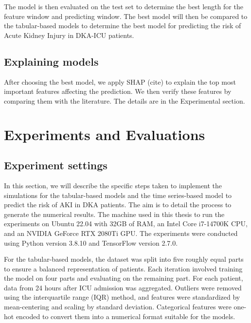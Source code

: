 \documentclass[sn-mathphys-num]{sn-jnl}%
\theoremstyle{thmstyleone}%
\theoremstyle{thmstyletwo}%
\theoremstyle{thmstylethree}%
\begin{document}
The model is then evaluated on the test set to determine the best length for the feature window and predicting window.
The best model will then be compared to the tabular-based models to determine the best model for predicting the risk of Acute Kidney Injury in DKA-ICU patients.



\subsection{Explaining models}

After choosing the best model, we apply SHAP (cite) to explain the top most important features affecting the prediction. We then verify these features by comparing them with the literature. The details are in the Experimental section.

\section{Experiments and Evaluations}
\label{sec:evaluation}


\subsection{Experiment settings}
\label{experiments_settings}
In this section, we will describe the specific steps taken to implement the simulations for the tabular-based models and the time series-based model to predict the risk of AKI in DKA patients.
The aim is to detail the process to generate the numerical results.
The machine used in this thesis to run the experiments on Ubuntu 22.04 with 32GB of RAM, an Intel Core i7-14700K CPU, and an NVIDIA GeForce RTX 2080Ti GPU. 
The experiments were conducted using Python version 3.8.10 and TensorFlow version 2.7.0. 

For the tabular-based models, the dataset was split into five roughly equal parts to ensure a balanced representation of patients.
Each iteration involved training the model on four parts and evaluating on the remaining part.
For each patient, data from 24 hours after ICU admission was aggregated.
Outliers were removed using the interquartile range (IQR) method, and features were standardized by mean-centering and scaling by standard deviation.
Categorical features were one-hot encoded to convert them into a numerical format suitable for the models.
\end{document}
